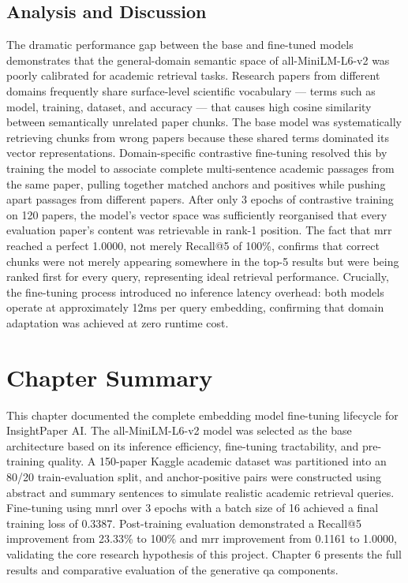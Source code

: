 \subsection{Analysis and Discussion}

The dramatic performance gap between the base and fine-tuned models demonstrates that the general-domain semantic space of all-MiniLM-L6-v2 was poorly calibrated for academic retrieval tasks. Research papers from different domains frequently share surface-level scientific vocabulary — terms such as model, training, dataset, and accuracy — that causes high cosine similarity between semantically unrelated paper chunks. The base model was systematically retrieving chunks from wrong papers because these shared terms dominated its vector representations.
\newline \newline Domain-specific contrastive fine-tuning resolved this by training the model to associate complete multi-sentence academic passages from the same paper, pulling together matched anchors and positives while pushing apart passages from different papers. After only 3 epochs of contrastive training on 120 papers, the model's vector space was sufficiently reorganised that every evaluation paper's content was retrievable in rank-1 position.
\newline \newline The fact that \gls{mrr} reached a perfect 1.0000, not merely Recall@5 of 100\%, confirms that correct chunks were not merely appearing somewhere in the top-5 results but were being ranked first for every query, representing ideal retrieval performance. Crucially, the fine-tuning process introduced no inference latency overhead: both models operate at approximately 12ms per query embedding, confirming that domain adaptation was achieved at zero runtime cost.

\section{Chapter Summary}

This chapter documented the complete embedding model fine-tuning lifecycle for InsightPaper AI. The all-MiniLM-L6-v2 model was selected as the base architecture based on its inference efficiency, fine-tuning tractability, and pre-training quality. A 150-paper Kaggle academic dataset was partitioned into an 80/20 train-evaluation split, and anchor-positive pairs were constructed using abstract and summary sentences to simulate realistic academic retrieval queries. Fine-tuning using \gls{mnrl} over 3 epochs with a batch size of 16 achieved a final training loss of 0.3387. Post-training evaluation demonstrated a Recall@5 improvement from 23.33\% to 100\% and \gls{mrr} improvement from 0.1161 to 1.0000, validating the core research hypothesis of this project. Chapter 6 presents the full results and comparative evaluation of the generative \gls{qa} components.
